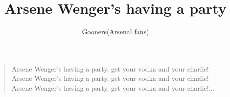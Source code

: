 \documentclass[a4paper,12pt]{article}
\title{Arsene Wenger's having a party}
\author{Gooners(Arsenal fans)}
\date{}
\begin{document}
	
	\maketitle
	
	\begin{verse}
		
		Arsene Wenger's having a party, get your vodka and your charlie! \\
		Arsene Wenger's having a party, get your vodka and your charlie! \\
		Arsene Wenger's having a party, get your vodka and your charlie!$\ldots$
		
	\end{verse}
	
\end{document}
